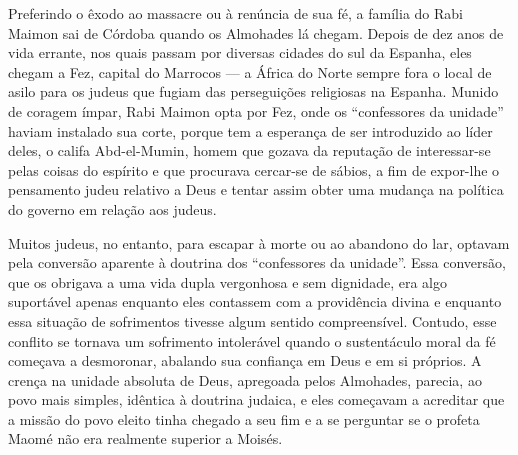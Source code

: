Preferindo o êxodo ao massacre ou à renúncia de sua fé, a família do
Rabi Maimon sai de Córdoba quando os Almohades lá chegam. Depois de dez
anos de vida errante, nos quais passam por diversas cidades do sul da
Espanha, eles chegam a Fez, capital do Marrocos --- a África do Norte
sempre fora o local de asilo para os judeus que fugiam das perseguições
religiosas na Espanha. Munido de coragem ímpar, Rabi Maimon opta por
Fez, onde os ``confessores da unidade'' haviam instalado sua corte,
porque tem a esperança de ser introduzido ao líder deles, o califa
Abd-el-Mumin, homem que gozava da reputação de interessar-se pelas coisas do espírito e que procurava
cercar-se de sábios, a fim de expor-lhe o pensamento judeu relativo a
Deus e tentar assim obter uma mudança na política do governo em relação
aos judeus.

Muitos judeus, no entanto, para escapar à morte ou ao abandono do lar,
optavam pela conversão aparente à doutrina dos ``confessores da
unidade''. Essa conversão, que os obrigava a uma vida dupla vergonhosa
e sem dignidade, era algo suportável apenas enquanto eles contassem com
a providência divina e enquanto essa situação de sofrimentos tivesse
algum sentido compreensível. Contudo, esse conflito se tornava um
sofrimento intolerável quando o sustentáculo moral da fé começava a
desmoronar, abalando sua confiança em Deus e em si próprios. A crença na
unidade absoluta de Deus, apregoada pelos Almohades, parecia, ao povo
mais simples, idêntica à doutrina judaica, e eles começavam a acreditar
que a missão do povo eleito tinha chegado a seu fim e a se perguntar se
o profeta Maomé não era realmente superior a Moisés.

